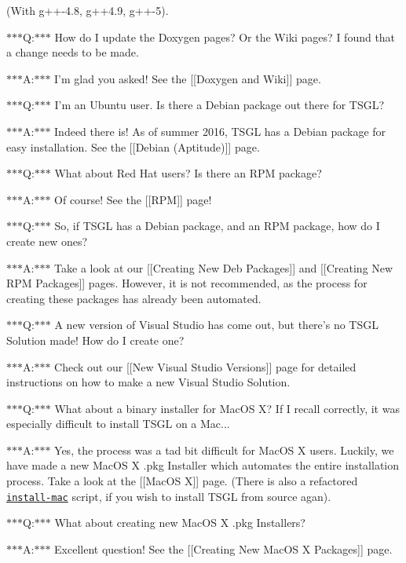 (With g++-\/4.8, g++4.9, g++-\/5).

$\ast$$\ast$$\ast$\-Q\-:$\ast$$\ast$$\ast$ How do I update the Doxygen pages? Or the Wiki pages? I found that a change needs to be made.

$\ast$$\ast$$\ast$\-A\-:$\ast$$\ast$$\ast$ I'm glad you asked! See the \mbox{[}\mbox{[}Doxygen and Wiki\mbox{]}\mbox{]} page.

$\ast$$\ast$$\ast$\-Q\-:$\ast$$\ast$$\ast$ I'm an Ubuntu user. Is there a Debian package out there for T\-S\-G\-L?

$\ast$$\ast$$\ast$\-A\-:$\ast$$\ast$$\ast$ Indeed there is! As of summer 2016, T\-S\-G\-L has a Debian package for easy installation. See the \mbox{[}\mbox{[}Debian (Aptitude)\mbox{]}\mbox{]} page.

$\ast$$\ast$$\ast$\-Q\-:$\ast$$\ast$$\ast$ What about Red Hat users? Is there an R\-P\-M package?

$\ast$$\ast$$\ast$\-A\-:$\ast$$\ast$$\ast$ Of course! See the \mbox{[}\mbox{[}R\-P\-M\mbox{]}\mbox{]} page!

$\ast$$\ast$$\ast$\-Q\-:$\ast$$\ast$$\ast$ So, if T\-S\-G\-L has a Debian package, and an R\-P\-M package, how do I create new ones?

$\ast$$\ast$$\ast$\-A\-:$\ast$$\ast$$\ast$ Take a look at our \mbox{[}\mbox{[}Creating New Deb Packages\mbox{]}\mbox{]} and \mbox{[}\mbox{[}Creating New R\-P\-M Packages\mbox{]}\mbox{]} pages. However, it is not recommended, as the process for creating these packages has already been automated.

$\ast$$\ast$$\ast$\-Q\-:$\ast$$\ast$$\ast$ A new version of Visual Studio has come out, but there's no T\-S\-G\-L Solution made! How do I create one?

$\ast$$\ast$$\ast$\-A\-:$\ast$$\ast$$\ast$ Check out our \mbox{[}\mbox{[}New Visual Studio Versions\mbox{]}\mbox{]} page for detailed instructions on how to make a new Visual Studio Solution.

$\ast$$\ast$$\ast$\-Q\-:$\ast$$\ast$$\ast$ What about a binary installer for Mac\-O\-S X? If I recall correctly, it was especially difficult to install T\-S\-G\-L on a Mac...

$\ast$$\ast$$\ast$\-A\-:$\ast$$\ast$$\ast$ Yes, the process was a tad bit difficult for Mac\-O\-S X users. Luckily, we have made a new Mac\-O\-S X .pkg Installer which automates the entire installation process. Take a look at the \mbox{[}\mbox{[}Mac\-O\-S X\mbox{]}\mbox{]} page. (There is also a refactored \href{https://github.com/Calvin-CS/TSGL/blob/master/install-mac}{\tt install-\/mac} script, if you wish to install T\-S\-G\-L from source agan).

$\ast$$\ast$$\ast$\-Q\-:$\ast$$\ast$$\ast$ What about creating new Mac\-O\-S X .pkg Installers?

$\ast$$\ast$$\ast$\-A\-:$\ast$$\ast$$\ast$ Excellent question! See the \mbox{[}\mbox{[}Creating New Mac\-O\-S X Packages\mbox{]}\mbox{]} page. 